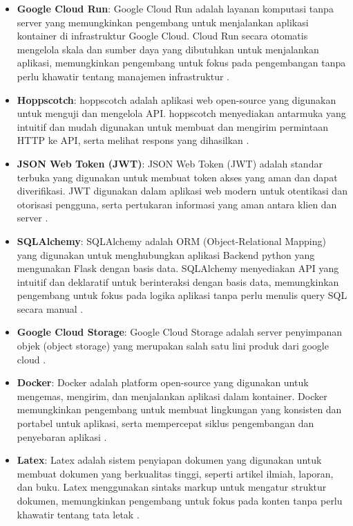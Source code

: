 \begin{itemize}
    \item \textbf{Google Cloud Run}: Google Cloud Run adalah layanan komputasi tanpa server yang memungkinkan pengembang untuk menjalankan aplikasi kontainer di infrastruktur Google Cloud. Cloud Run secara otomatis mengelola skala dan sumber daya yang dibutuhkan untuk menjalankan aplikasi, memungkinkan pengembang untuk fokus pada pengembangan tanpa perlu khawatir tentang manajemen infrastruktur \cite{cloudrun}.

    \item \textbf{Hoppscotch}: hoppscotch adalah aplikasi web open-source yang digunakan untuk menguji dan mengelola API. hoppscotch menyediakan antarmuka yang intuitif dan mudah digunakan untuk membuat dan mengirim permintaan HTTP ke API, serta melihat respons yang dihasilkan \cite{hoppscotch}.

    \item \textbf{JSON Web Token (JWT)}: JSON Web Token (JWT) adalah standar terbuka yang digunakan untuk membuat token akses yang aman dan dapat diverifikasi. JWT digunakan dalam aplikasi web modern untuk otentikasi dan otorisasi pengguna, serta pertukaran informasi yang aman antara klien dan server \cite{jwt}.

    \item \textbf{SQLAlchemy}: SQLAlchemy adalah ORM (Object-Relational Mapping) yang digunakan untuk menghubungkan aplikasi Backend python yang mengunakan Flask dengan basis data. SQLAlchemy menyediakan API yang intuitif dan deklaratif untuk berinteraksi dengan basis data, memungkinkan pengembang untuk fokus pada logika aplikasi tanpa perlu menulis query SQL secara manual \cite{sqlaclhemy}.

    \item \textbf{Google Cloud Storage}: Google Cloud Storage adalah server penyimpanan objek (object storage) yang merupakan salah satu lini produk dari google cloud \cite{gcs}.

    \item \textbf{Docker}: Docker adalah platform open-source yang digunakan untuk mengemas, mengirim, dan menjalankan aplikasi dalam kontainer. Docker memungkinkan pengembang untuk membuat lingkungan yang konsisten dan portabel untuk aplikasi, serta mempercepat siklus pengembangan dan penyebaran aplikasi \cite{docker}.


    \item \textbf{Latex}: Latex adalah sistem penyiapan dokumen yang digunakan untuk membuat dokumen yang berkualitas tinggi, seperti artikel ilmiah, laporan, dan buku. Latex menggunakan sintaks markup untuk mengatur struktur dokumen, memungkinkan pengembang untuk fokus pada konten tanpa perlu khawatir tentang tata letak \cite{latex}.
\end{itemize}

